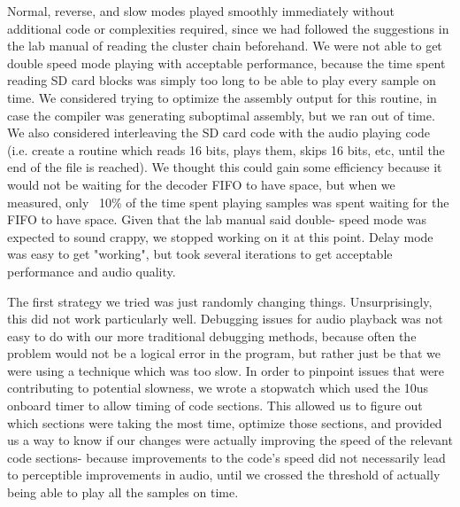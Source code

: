 \documentclass[12pt]{article}
\begin{document}
Normal, reverse, and slow modes played smoothly immediately without additional
code or complexities required, since we had followed the suggestions in the
lab manual of reading the cluster chain beforehand. We were not able to get
double speed mode playing with acceptable performance, because the time spent
reading SD card blocks was simply too long to be able to play every sample on
time. We considered trying to optimize the assembly output for this routine,
in case the compiler was generating suboptimal assembly, but we ran out of
time. We also considered interleaving the SD card code with the audio playing
code (i.e. create a routine which reads 16 bits, plays them, skips 16 bits,
etc, until the end of the file is reached). We thought this could gain some
efficiency because it would not be waiting for the decoder FIFO to have space,
but when we measured, only ~10\% of the time spent playing samples was spent
waiting for the FIFO to have space. Given that the lab manual said double-
speed mode was expected to sound crappy, we stopped working on it at this
point. Delay mode was easy to get "working", but took several iterations to
get acceptable performance and audio quality.



The first strategy we tried was just randomly changing things. Unsurprisingly,
this did not work particularly well. Debugging issues for audio playback
was not easy to do with our more traditional debugging methods, because often
the problem would not be a logical error in the program, but rather just be
that we were using a technique which was too slow. In order to pinpoint issues
that were contributing to potential slowness, we wrote a stopwatch which used
the 10us onboard timer to allow timing of code sections. This allowed us to
figure out which sections were taking the most time, optimize those sections,
and provided us a way to know if our changes were actually improving the speed
of the relevant code sections- because improvements to the code's speed did
not necessarily lead to perceptible improvements in audio, until we crossed
the threshold of actually being able to play all the samples on time.
\end{document}
